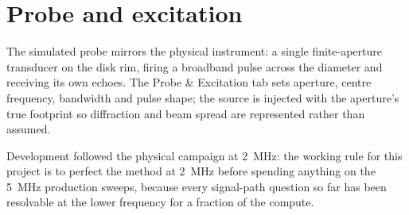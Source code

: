 \section{Probe and excitation}

The simulated probe mirrors the physical instrument: a single
finite-aperture transducer on the disk rim, firing a broadband pulse
across the diameter and receiving its own echoes. The Probe \&
Excitation tab sets aperture, centre frequency, bandwidth and pulse
shape; the source is injected with the aperture's true footprint so
diffraction and beam spread are represented rather than assumed.

Development followed the physical campaign at \SI{2}{MHz}: the
working rule for this project is to perfect the method at
\SI{2}{MHz} before spending anything on the \SI{5}{MHz} production
sweeps, because every signal-path question so far has been resolvable
at the lower frequency for a fraction of the compute.

